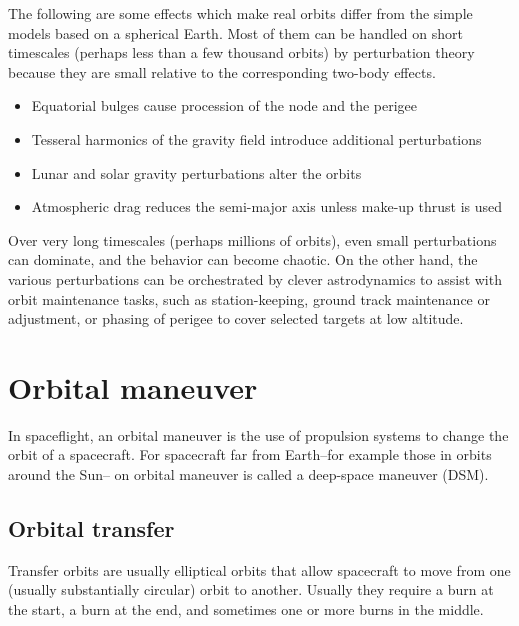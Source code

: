 \documentclass[12pt]{article}
\begin{document}
The following are some effects which make real orbits differ from the simple models based on a spherical Earth. Most of them can be handled on short timescales (perhaps less than a few thousand orbits) by perturbation theory because they are small relative to the corresponding two-body effects.

\begin{itemize}
  \item Equatorial bulges cause procession of the node and the perigee
  \item Tesseral harmonics of the gravity field introduce additional perturbations
  \item Lunar and solar gravity perturbations alter the orbits
  \item Atmospheric drag reduces the semi-major axis unless make-up thrust is used
\end{itemize}

Over very long timescales (perhaps millions of orbits), even small perturbations can dominate, and the behavior can become chaotic. On the other hand, the various perturbations can be orchestrated by clever astrodynamics to assist with orbit maintenance tasks, such as station-keeping, ground track maintenance or adjustment, or phasing of perigee to cover selected targets at low altitude.

\section{Orbital maneuver}

In spaceflight, an orbital maneuver is the use of propulsion systems to change the orbit of a spacecraft. For spacecraft far from Earth--for example those in orbits around the Sun-- on orbital maneuver is called a deep-space maneuver (DSM).

\subsection{Orbital transfer}

Transfer orbits are usually elliptical orbits that allow spacecraft to move from one (usually substantially circular) orbit to another. Usually they require a burn at the start, a burn at the end, and sometimes one or more burns in the middle.
\end{document}
